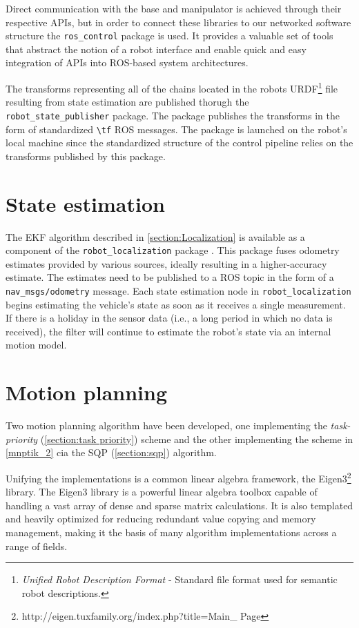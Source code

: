 \documentclass[times, utf8, diplomski, english]{fer}
\begin{document}
Direct communication with the base and manipulator is achieved through their respective APIs, but in order to connect these libraries to our networked software structure the \verb|ros_control| package is used. 
It provides a valuable set of tools that abstract the notion of a robot interface and enable quick and easy integration of APIs into ROS-based system architectures.

The transforms representing all of the chains located in the robots URDF\footnote{\textit{Unified Robot Description Format} - Standard file format used for semantic robot descriptions.} file resulting from state estimation are published thorugh the \verb|robot_state_publisher| package. The package publishes the transforms in the form of standardized \verb|\tf| ROS messages.
The package is launched on the robot's local machine since the standardized structure of the control pipeline relies on the transforms published by this package.

\section{State estimation}\label{section:code state estimation}
The EKF algorithm described in \ref{section:Localization} is available as a component of the \verb|robot_localization| package \citep{MooreStouchKeneralizedEkf2014}.
This package fuses odometry estimates provided by various sources, ideally resulting in a higher-accuracy estimate.
The estimates need to be published to a ROS topic in the form of a \verb|nav_msgs/odometry| message.
Each state estimation node in \verb|robot_localization| begins estimating the vehicle’s state as soon as it receives a single measurement. If there is a holiday in the sensor data (i.e., a long period in which no data is received), the filter will continue to estimate the robot’s state via an internal motion model.

\section{Motion planning}\label{section:code motion planning}
Two motion planning algorithm have been developed, one implementing the \textit{task-priority} (\ref{section:task priority}) scheme and the other implementing the scheme in \ref{mnptik_2} cia the SQP (\ref{section:sqp}) algorithm.

Unifying the implementations is a common linear algebra framework, the Eigen3\footnote{http://eigen.tuxfamily.org/index.php?title=Main\_ Page} library.
The Eigen3 library is a powerful linear algebra toolbox capable of handling a vast array of dense and sparse matrix calculations.
It is also templated and heavily optimized for reducing redundant value copying and memory management, making it the basis of many algorithm implementations across a range of fields.
\end{document}
